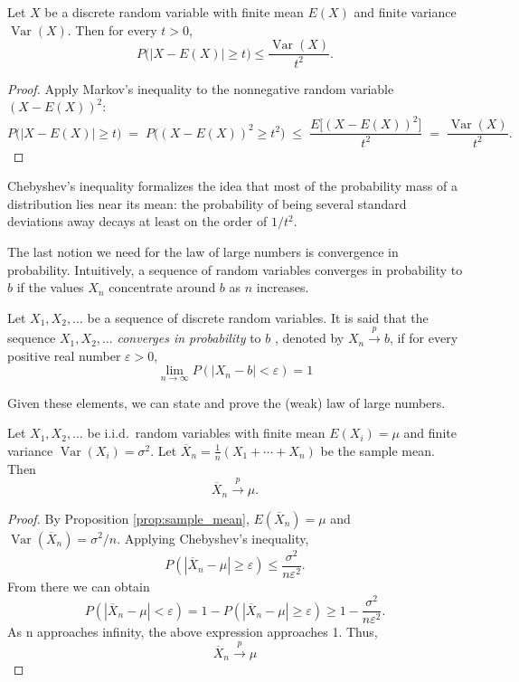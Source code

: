 \begin{corollary}
Let $X$ be a discrete random variable with finite mean $E(X)$ and finite variance $\operatorname{Var}(X)$. Then for every $t>0$,
\[
P\big(|X - E(X)| \ge t\big) \le \frac{\operatorname{Var}(X)}{t^2}.
\]
\end{corollary}
\begin{proof}
Apply Markov's inequality to the nonnegative random variable $(X - E(X))^2$:
\[
P\big(|X - E(X)| \ge t\big) \;=\; P\big((X - E(X))^2 \ge t^2\big)
\;\le\; \frac{E\big[(X - E(X))^2\big]}{t^2}
\;=\; \frac{\operatorname{Var}(X)}{t^2}.
\]
\end{proof}

Chebyshev's inequality formalizes the idea that most of the probability mass of a distribution lies near its mean: the probability of being several standard deviations away decays at least on the order of $1/t^2$.

The last notion we need for the law of large numbers is convergence in probability. Intuitively, a sequence of random variables converges in probability to $b$ if the values $X_n$ concentrate around $b$ as $n$ increases.

\begin{definition}
Let $X_{1}, X_{2}, \ldots$ be a sequence of discrete random variables. It is said that the sequence $X_{1}, X_{2}, \ldots$ \emph{converges in probability} to $b$ , denoted by $X_{n} \overset{p}{\rightarrow}b$, if for every positive real number $\varepsilon>0$,
\[
\lim_{n \rightarrow \infty} P \left( \left| X_{n} - b \right| < \varepsilon \right) = 1
\]
\end{definition}

Given these elements, we can state and prove the (weak) law of large numbers.

\begin{theorem}
\label{th:law_large_numbers}
Let $X_1, X_2, \ldots$ be i.i.d.\ random variables with finite mean $E(X_i)=\mu$ and finite variance $\operatorname{Var}(X_i)=\sigma^2$. Let $\overline{X}_n = \frac{1}{n}(X_1 + \cdots + X_n)$ be the sample mean. Then
\[
\overline{X}_n \overset{p}{\to} \mu.
\]
\end{theorem}
\begin{proof}
By Proposition \ref{prop:sample_mean}, $E(\overline{X}_n)=\mu$ and $\operatorname{Var}(\overline{X}_n)=\sigma^2/n$. Applying Chebyshev's inequality,
\[
P \left( \left| \overline {X}_n- \mu \right| \geq \varepsilon \right) \leq \frac{\sigma ^2}{n \varepsilon^2}.
\]
From there we can obtain
\[
P \left( \left| \overline {X}_n - \mu \right| < \varepsilon \right) = 1 - P \left( \left| \overline {X}_n - \mu \right| \geq \varepsilon \right) \geq 1 - \frac{\sigma ^2}{n \varepsilon^2}.
\]
As n approaches infinity, the above expression approaches 1. Thus,
\[
\overline{X}_n \overset{p}{\rightarrow} \mu
\]
\end{proof}

